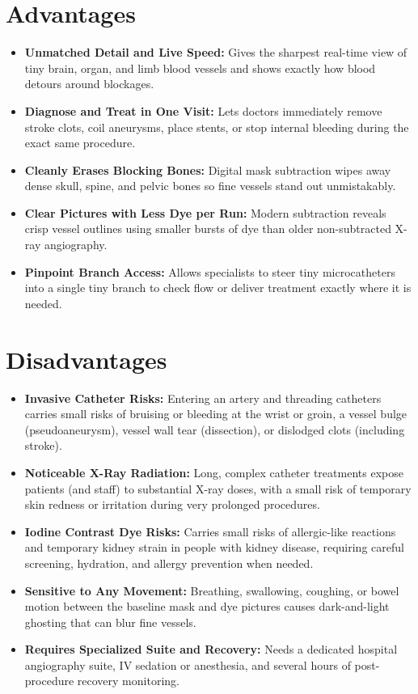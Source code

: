 \section{Advantages}
\begin{itemize}
\item \textbf{Unmatched Detail and Live Speed:} Gives the sharpest real-time view of tiny brain, organ, and limb blood vessels and shows exactly how blood detours around blockages.
\item \textbf{Diagnose and Treat in One Visit:} Lets doctors immediately remove stroke clots, coil aneurysms, place stents, or stop internal bleeding during the exact same procedure.
\item \textbf{Cleanly Erases Blocking Bones:} Digital mask subtraction wipes away dense skull, spine, and pelvic bones so fine vessels stand out unmistakably.
\item \textbf{Clear Pictures with Less Dye per Run:} Modern subtraction reveals crisp vessel outlines using smaller bursts of dye than older non-subtracted X-ray angiography.
\item \textbf{Pinpoint Branch Access:} Allows specialists to steer tiny microcatheters into a single tiny branch to check flow or deliver treatment exactly where it is needed.
\end{itemize}

\section{Disadvantages}
\begin{itemize}
\item \textbf{Invasive Catheter Risks:} Entering an artery and threading catheters carries small risks of bruising or bleeding at the wrist or groin, a vessel bulge (pseudoaneurysm), vessel wall tear (dissection), or dislodged clots (including stroke).
\item \textbf{Noticeable X-Ray Radiation:} Long, complex catheter treatments expose patients (and staff) to substantial X-ray doses, with a small risk of temporary skin redness or irritation during very prolonged procedures.
\item \textbf{Iodine Contrast Dye Risks:} Carries small risks of allergic-like reactions and temporary kidney strain in people with kidney disease, requiring careful screening, hydration, and allergy prevention when needed.
\item \textbf{Sensitive to Any Movement:} Breathing, swallowing, coughing, or bowel motion between the baseline mask and dye pictures causes dark-and-light ghosting that can blur fine vessels.
\item \textbf{Requires Specialized Suite and Recovery:} Needs a dedicated hospital angiography suite, IV sedation or anesthesia, and several hours of post-procedure recovery monitoring.
\end{itemize}

